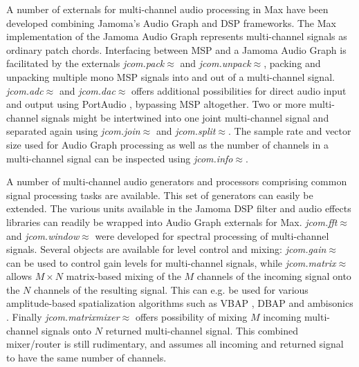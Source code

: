\documentclass[twoside,a4paper]{article}
\begin{document}
A number of externals for multi-channel audio processing in Max have been developed combining Jamoma's Audio Graph and DSP frameworks. 
The Max implementation of the Jamoma Audio Graph represents multi-channel signals as ordinary patch chords.
Interfacing between MSP and a Jamoma Audio Graph is facilitated by the externals \emph{jcom.pack$\approx$} and \emph{jcom.unpack$\approx$}, packing and unpacking multiple mono MSP signals into and out of a multi-channel signal. 
\emph{jcom.adc$\approx$} and \emph{jcom.dac$\approx$} offers additional possibilities for direct audio input and output using PortAudio \cite{Bencina:2003}, bypassing MSP altogether. 
Two or more multi-channel signals might be intertwined into one joint multi-channel signal and separated again using \emph{jcom.join$\approx$} and \emph{jcom.split$\approx$}.
The sample rate and vector size used for Audio Graph processing as well as the number of channels in a multi-channel signal can be inspected using \emph{jcom.info$\approx$}.

A number of multi-channel audio generators and processors comprising common signal processing tasks are available. %
This set of generators can easily be extended.
The various units available in the Jamoma DSP filter and audio effects libraries can readily be wrapped into Audio Graph externals for Max.
\emph{jcom.fft$\approx$} and \emph{jcom.window$\approx$} were developed for spectral processing of multi-channel signals.
Several objects are available for level control and mixing: 
\emph{jcom.gain$\approx$} can be used to control gain levels for multi-channel signals, while \emph{jcom.matrix$\approx$} allows $M \times N$ matrix-based mixing of the $M$ channels of the incoming signal onto the $N$ channels of the resulting signal. 
This can e.g. be used for various amplitude-based spatialization algorithms such as VBAP \cite{Pulkki:1997vbap}, DBAP \cite{lossius:2009} and ambisonics \cite{Schacher:2006ambi_max}.
Finally \emph{jcom.matrixmixer$\approx$} offers possibility of mixing $M$ incoming multi-channel signals onto $N$ returned multi-channel signal.
This combined mixer/router is still rudimentary, and assumes all incoming and returned signal to have the same number of channels.
\end{document}
